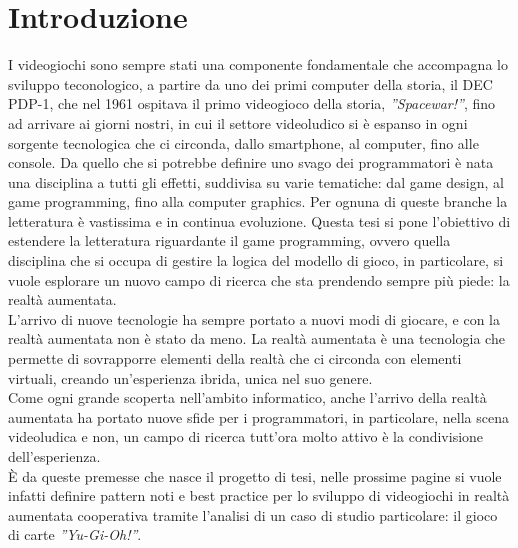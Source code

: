 \chapter{Introduzione}\label{chap:Introduzione}

I videogiochi sono sempre stati una componente fondamentale che accompagna lo 
sviluppo teconologico, a partire da uno dei primi computer della storia, il DEC PDP-1,
che nel 1961 ospitava il primo videogioco della storia, \textit{''Spacewar!''}, fino ad arrivare
ai giorni nostri, in cui il settore videoludico si è espanso in ogni sorgente tecnologica
che ci circonda, dallo smartphone, al computer, fino alle console. Da quello che si 
potrebbe definire uno svago dei programmatori è nata una disciplina a tutti gli effetti,
suddivisa su varie tematiche: dal game design, al game programming, fino alla computer
graphics. Per ognuna di queste branche la letteratura è vastissima e in continua
evoluzione. Questa tesi si pone l'obiettivo di estendere la letteratura riguardante
il game programming, ovvero quella disciplina che si occupa di gestire la logica
del modello di gioco, in particolare, si vuole esplorare un nuovo campo di ricerca
che sta prendendo sempre più piede: la realtà aumentata.\\
L'arrivo di nuove tecnologie ha sempre portato a nuovi modi di giocare, e con la 
realtà aumentata non è stato da meno. La realtà aumentata è una tecnologia che 
permette di sovrapporre elementi della realtà che ci circonda con elementi virtuali, 
creando un'esperienza ibrida, unica nel suo genere.\\
Come ogni grande scoperta nell'ambito informatico, anche l'arrivo della realtà 
aumentata ha portato nuove sfide per i programmatori, in particolare, nella scena 
videoludica e non, un campo di ricerca tutt'ora molto attivo è la condivisione 
dell'esperienza.\\
È da queste premesse che nasce il progetto di tesi, nelle prossime
pagine si vuole infatti definire pattern noti e best practice per lo sviluppo di 
videogiochi in realtà aumentata cooperativa tramite l'analisi di un caso di studio
particolare: il gioco di carte \textit{''Yu-Gi-Oh!''}.\\
\\
